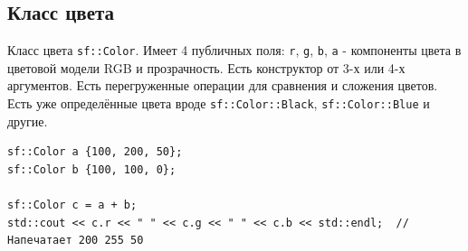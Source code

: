 \documentclass{article}
\begin{document}
\subsection*{Класс цвета}
Класс цвета \texttt{sf::Color}. Имеет 4 публичных поля: \texttt{r}, \texttt{g}, \texttt{b}, \texttt{a} - компоненты цвета в цветовой модели RGB и прозрачность. Есть конструктор от 3-х или 4-х аргументов. Есть перегруженные операции для сравнения и сложения цветов. Есть уже определённые цвета вроде \texttt{sf::Color::Black}, \texttt{sf::Color::Blue} и другие.

\begin{lstlisting}
sf::Color a {100, 200, 50};
sf::Color b {100, 100, 0};

sf::Color c = a + b;
std::cout << c.r << " " << c.g << " " << c.b << std::endl;  // Напечатает 200 255 50
\end{lstlisting}
\end{document}
